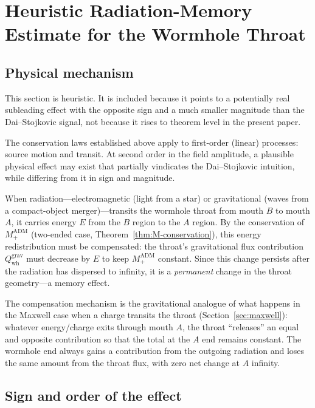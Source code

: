 \documentclass[aps,prd,onecolumn,nofootinbib,superscriptaddress]{revtex4-2}
\begin{document}
\section{Heuristic Radiation-Memory Estimate for the Wormhole Throat}
\label{sec:memory}

\subsection{Physical mechanism}

This section is heuristic.  It is included because it points to a potentially
real subleading effect with the opposite sign and a much smaller magnitude than
the Dai--Stojkovic signal, not because it rises to theorem level in the present
paper.

The conservation laws established above apply to first-order (linear) processes:
source motion and transit.  At second order in the field amplitude, a plausible
physical effect may exist that partially vindicates the Dai--Stojkovic
intuition, while differing from it in sign and magnitude.

When radiation---electromagnetic (light from a star) or gravitational (waves
from a compact-object merger)---transits the wormhole throat from mouth $B$ to
mouth $A$, it carries energy $E$ from the $B$ region to the $A$ region.
By the conservation of $M_+^{\mathrm{ADM}}$ (two-ended case, Theorem~\ref{thm:M-conservation}),
this energy redistribution must be compensated: the throat's gravitational flux
contribution $Q_{\mathrm{wh}}^{\mathrm{grav}}$ must decrease by $E$ to keep
$M_+^{\mathrm{ADM}}$ constant.  Since this change persists after the radiation
has dispersed to infinity, it is a \emph{permanent} change in the throat
geometry---a memory effect.

The compensation mechanism is the gravitational analogue of what happens in the
Maxwell case when a charge transits the throat (Section~\ref{sec:maxwell}):
whatever energy/charge exits through mouth $A$, the throat ``releases'' an
equal and opposite contribution so that the total at the $A$ end remains
constant.  The wormhole end always gains a contribution from the outgoing
radiation and loses the same amount from the throat flux, with zero net change
at $A$ infinity.

\subsection{Sign and order of the effect}
\end{document}
